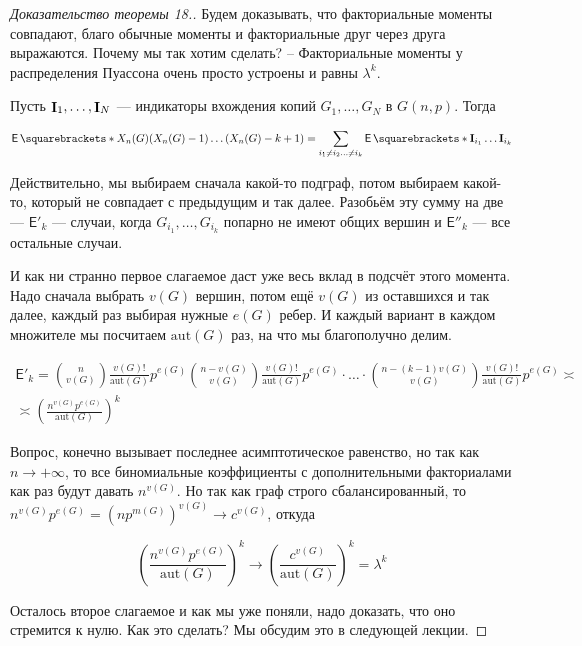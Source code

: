 \begin{proof}[Доказательство теоремы 18.]
  Будем доказывать, что факториальные моменты совпадают, благо обычные моменты
  и факториальные друг через друга выражаются. Почему мы так хотим сделать? 
  -- Факториальные моменты у распределения Пуассона очень просто устроены и равны
  $\lambda^k$.

  Пусть $\mathop{\mathbf{I}}_1, \ldots, \mathop{\mathbf{I}}_N$ --- индикаторы вхождения копий $G_1,\ldots,G_N$ в
  $G(n, p)$. Тогда 

  \[
    \E{X_n(G)(X_n(G) - 1)\ldots(X_n(G) - k + 1)} =
    \sum\limits_{i_1 \neq i_2 \ldots \neq i_k} \E{\mathbf{I}_{i_1}
    \ldots\mathbf{I}_{i_k}}
  \]

  Действительно, мы выбираем сначала какой-то подграф, потом выбираем какой-то,
  который не совпадает с предыдущим и так далее. Разобьём эту сумму на две ---
  $\mathsf{E'}_k$ --- случаи, когда $G_{i_1},\ldots,G_{i_k}$ попарно не имеют
  общих вершин и $\mathsf{E''}_k$ --- все остальные случаи.

  И как ни странно первое слагаемое даст уже весь вклад в подсчёт этого момента.
  Надо сначала выбрать $v(G)$ вершин, потом ещё $v(G)$ из оставшихся и так далее,
  каждый раз выбирая нужные $e(G)$ ребер.
  И каждый вариант в каждом множителе мы посчитаем $\mathrm{aut}(G)$ раз, на что
  мы благополучно делим.

  \begin{multline}
    \mathsf{E'}_k = \binom{n}{v(G)}\frac{v(G)!}{\mathrm{aut}(G)}p^{e(G)}
    \binom{n - v(G)}{v(G)}\frac{v(G)!}{\mathrm{aut}(G)}p^{e(G)}\cdot\ldots\cdot
    \binom{n - (k - 1)v(G)}{v(G)}\frac{v(G)!}{\mathrm{aut}(G)}p^{e(G)} 
    \asymp\\\asymp
    \left(\frac{n^{v(G)}p^{e(G)}}{\mathrm{aut}(G)}\right)^k
  \end{multline}

  Вопрос, конечно вызывает последнее асимптотическое равенство, но так как 
  $n \to +\infty$, то все биномиальные коэффициенты с дополнительными
  факториалами как раз будут давать $n^{v(G)}$. Но так как граф строго 
  сбалансированный, то $n^{v(G)}p^{e(G)}= (np^{m(G)})^{v(G)} \to c^{v(G)}$, откуда

  \[
    \left(\frac{n^{v(G)}p^{e(G)}}{\mathrm{aut}(G)}\right)^k \to 
    \left(\frac{c^{v(G)}}{\mathrm{aut}(G)}\right)^k = \lambda^k
  \]

  Осталось второе слагаемое и как мы уже поняли, надо доказать, что оно
  стремится к нулю. Как это сделать? Мы обсудим это в следующей лекции.
\end{proof}
